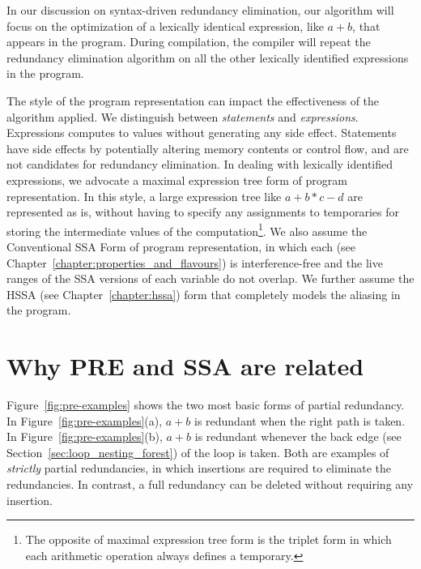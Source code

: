In our discussion on syntax-driven redundancy elimination, our algorithm will focus on the optimization of a lexically identical expression, like $a+b$, that appears in the program. 
During compilation, the compiler will repeat the redundancy elimination algorithm on all the other lexically identified expressions in the program.

The style of the program representation can impact the effectiveness of the algorithm applied. 
We distinguish between \emph{statements} and \emph{expressions}. 
Expressions computes to values without generating any side effect. 
Statements have side effects by potentially altering memory contents or control flow, and are not candidates for redundancy elimination. 
In dealing with lexically identified expressions, we advocate a maximal expression tree form of program representation. 
In this style, a large expression tree like $a+b*c-d$ are represented as is, without having to specify any assignments to temporaries for storing the intermediate values of the computation\footnote{The opposite of maximal expression tree form is the triplet form in which each arithmetic operation always defines a temporary.}. 
We also assume the Conventional SSA Form of program representation, in which each \phiweb{} (see Chapter~\ref{chapter:properties_and_flavours}) is interference-free and the live ranges of the SSA versions of each variable do not overlap. 
We further assume the HSSA (see Chapter~\ref{chapter:hssa}) form that completely models the aliasing in the program.

\section{Why PRE and SSA are related}
\label{section:Part3:Pre_not_helped:PRErelatedtoSSA}

Figure~\ref{fig:pre-examples} shows the two most basic forms of partial redundancy. 
In Figure~\ref{fig:pre-examples}(a), $a+b$ is redundant when the right path is taken. 
In Figure~\ref{fig:pre-examples}(b), $a+b$ is redundant whenever the back edge (see Section~\ref{sec:loop_nesting_forest}) of the loop is taken. 
Both are examples of \emph{strictly} partial redundancies, in which insertions are required to eliminate the redundancies. 
In contrast, a full redundancy can be deleted without requiring any insertion. 

